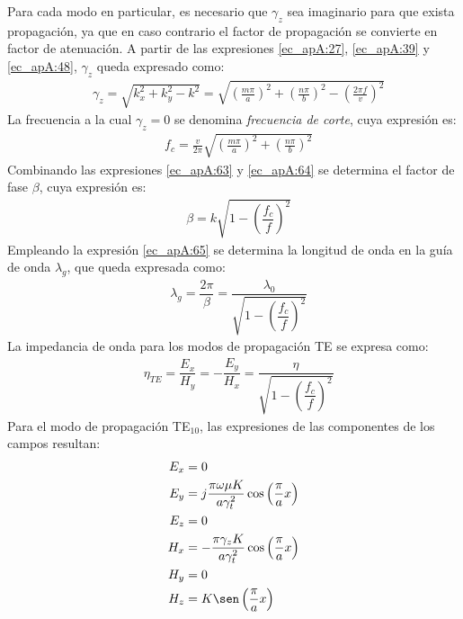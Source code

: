 Para cada modo en particular, es necesario que $\gamma_z$ sea imaginario para que exista propagación, ya que en caso contrario el factor de propagación se convierte en factor de atenuación. A partir de las expresiones \eqref{ec_apA:27}, \eqref{ec_apA:39} y \eqref{ec_apA:48}, $\gamma_z$ queda expresado como:
\begin{align}
&\gamma_z = \sqrt{k^2_x + k^2_y - k^2} = \sqrt{\left(\frac{m\pi}{a}\right)^2 + \left(\frac{n\pi}{b}\right)^2 - \left(\frac{2\pi f}{v}\right)^2}
\label{ec_apA:63}
\end{align}
La frecuencia a la cual $\gamma_z = 0$ se denomina \emph{frecuencia de corte}, cuya expresión es:
\begin{align}
&f_c = \frac{v}{2\pi}\sqrt{\left(\frac{m\pi}{a}\right)^2 + \left(\frac{n\pi}{b}\right)^2}
\label{ec_apA:64}
\end{align}
Combinando las expresiones \eqref{ec_apA:63} y \eqref{ec_apA:64} se determina el factor de fase $\beta$, cuya expresión es:
\begin{align}
&\beta = k\sqrt{1 - \left(\dfrac{f_c}{f}\right)^2}
\label{ec_apA:65}
\end{align}
Empleando la expresión \eqref{ec_apA:65} se determina la longitud de onda en la guía de onda $\lambda_g$, que queda expresada como:
\begin{align}
&\lambda_g = \dfrac{2\pi}{\beta} = \dfrac{\lambda_0}{\sqrt{1 - \left(\dfrac{f_c}{f}\right)^2}}
\label{ec_apA:66}
\end{align}
La impedancia de onda para los modos de propagación TE se expresa como:
\begin{align}
&\eta_{TE} = \dfrac{E_x}{H_y} = -\dfrac{E_y}{H_x} = \dfrac{\eta}{\sqrt{1 - \left(\dfrac{f_c}{f}\right)^2}}
\label{ec_apA:67}
\end{align}
Para el modo de propagación TE$_{10}$, las expresiones de las componentes de los campos resultan:
\begin{subequations}
\label{grup_ec_apA:15}
\begin{align}
E_x &= 0
\label{ec_apA:68}\\
E_y &= j\frac{\pi\omega\mu K}{a\gamma_t^2}\cos\left(\frac{\pi}{a}x\right)
\label{ec_apA:69}\\
E_z &= 0
\label{ec_apA:70}\\
H_x &= -\frac{\pi\gamma_zK}{a\gamma_t^2}\cos\left(\frac{\pi}{a}x\right)
\label{ec_apA:71}\\
H_y &= 0
\label{ec_apA:72}\\
H_z &= K\sen\left(\frac{\pi}{a}x\right)
\label{ec_apA:73}
\end{align}
\end{subequations}
